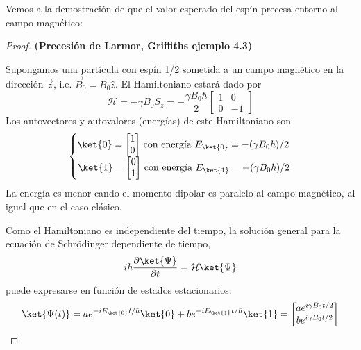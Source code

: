 \documentclass[a4paper,11pt]{book} %
\numberwithin{equation}{chapter}
\def\lch{\left\{}
\begin{document}
Vemos a la demostración de que el valor esperado del espín precesa entorno al campo magnético:

\begin{proof}
\textbf{(Precesión de Larmor, Griffiths \cite{bib_griffiths_schroeter_2018} ejemplo 4.3)} 

Supongamos una partícula con espín 1/2 sometida a un campo magnético en la dirección $\vec{z}$, i.e. $\vec{B}_0 = B_0 \hat{z}$. El Hamiltoniano estará dado por 
	\begin{equation}
	\mathcal{H} = - \gamma B_0 S_z = - \frac{\gamma B_0 \hbar}{2} 
	\begin{bmatrix}	1 & 0 \\ 0 & -1 \end{bmatrix}
	\end{equation}
Los autovectores y autovalores (energías) de este Hamiltoniano son
	\begin{equation}
	\lch 
	\begin{matrix}
	\ket{0} = \begin{bmatrix} 1 \\ 0 \end{bmatrix} \, 
	\text{con energía } E_{\ket{0}} = - (\gamma B_0 \hbar) /2 \, \\
	\ket{1} = \begin{bmatrix} 0 \\ 1 \end{bmatrix} \, 
	\text{con energía } E_{\ket{1}} = + (\gamma B_0 \hbar) / 2
	\end{matrix}
	\right.
	\end{equation}
La energía es menor cando el momento dipolar es paralelo al campo magnético, al igual que en el caso clásico.

Como el Hamiltoniano es independiente del tiempo, la solución general para la ecuación de Schrödinger dependiente de tiempo,
	\begin{equation} \label{ec_Hardware_NMR_schrodinger}
	i \hbar \frac{\partial \ket{\Psi}}{\partial t} = \mathcal{H} \ket{\Psi}
	\end{equation}
puede expresarse en función de estados estacionarios:
	\begin{equation} \label{ec_Hardware_NMR_schrodinger_sol}
	\ket{\Psi (t)} = a  e^{-i E_{\ket{0}} t/ \hbar} \ket{0} + b  e^{-i E_{\ket{1}} t/ \hbar} \ket{1}  =
	\begin{bmatrix}
	a e ^{i \gamma B_0 t/2} \\
	b e ^{i \gamma B_0 t/2}
	\end{bmatrix}
	\end{equation}


\end{proof}
\end{document}
